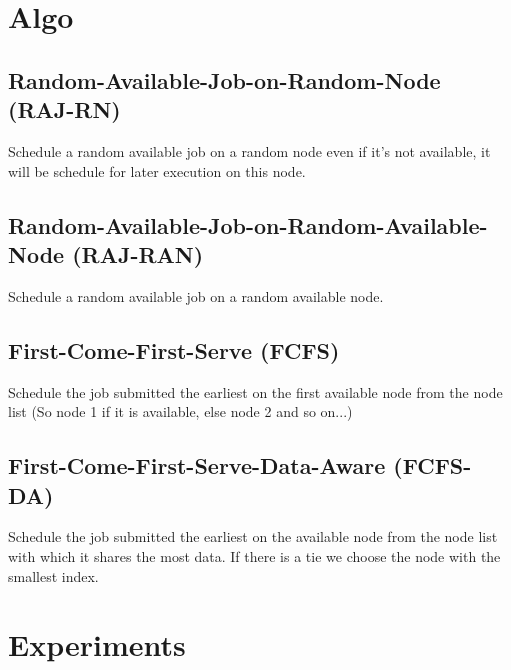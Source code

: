 \documentclass[a4paper]{article}
\begin{document}
\section{Algo}

\subsection{Random-Available-Job-on-Random-Node (RAJ-RN)}
Schedule a random available job on a random node even if it's not available, it will be schedule for later execution on this node.

\subsection{Random-Available-Job-on-Random-Available-Node (RAJ-RAN)}
Schedule a random available job on a random available node.

\subsection{First-Come-First-Serve (FCFS)}
Schedule the job submitted the earliest on the first available node from the node list (So node 1 if it is available, else node 2 and so on...)

\subsection{First-Come-First-Serve-Data-Aware (FCFS-DA)}
Schedule the job submitted the earliest on the available node from the node list with which it shares the most data. If there is a tie we choose the node with the smallest index.

\section{Experiments}
\end{document}
